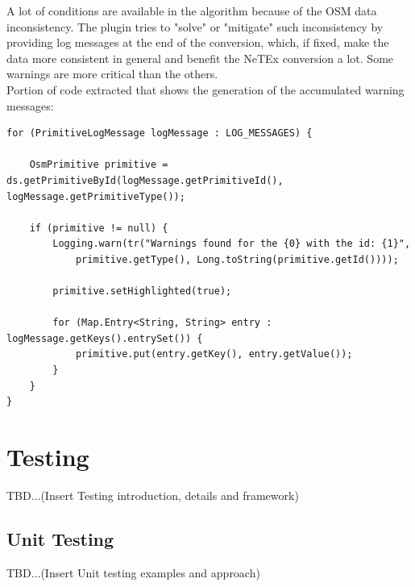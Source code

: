 A lot of conditions are available in the algorithm because of the OSM data inconsistency. The plugin tries to "solve" or "mitigate" such inconsistency by providing log messages at the end of the conversion, which, if fixed, make the data more consistent in general and benefit the NeTEx conversion a lot. Some warnings are more critical than the others.\\
\newpage
Portion of code extracted that shows the generation of the accumulated warning messages:
\begin{verbatim}
for (PrimitiveLogMessage logMessage : LOG_MESSAGES) {

	OsmPrimitive primitive = ds.getPrimitiveById(logMessage.getPrimitiveId(), logMessage.getPrimitiveType());

	if (primitive != null) {
		Logging.warn(tr("Warnings found for the {0} with the id: {1}",
			primitive.getType(), Long.toString(primitive.getId())));

		primitive.setHighlighted(true);

		for (Map.Entry<String, String> entry : logMessage.getKeys().entrySet()) {
			primitive.put(entry.getKey(), entry.getValue());
		}
	}
}
\end{verbatim}
\section{Testing}
TBD...(Insert Testing introduction, details and framework)
\subsection{Unit Testing}
TBD...(Insert Unit testing examples and approach)
\newpage
